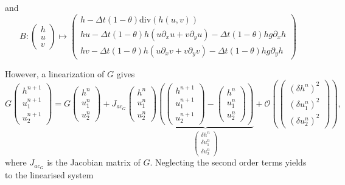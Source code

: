 \documentclass[a4paper, 11pt]{article}
\begin{document}
and
\begin{equation*}
B:
\begin{pmatrix}
h\\u\\v
\end{pmatrix}\mapsto\begin{pmatrix}h-\Delta t(1-\theta)\text{div}(h(u,v))\\
hu-\Delta t(1-\theta)h\left(u\partial_xu+v\partial_yu\right)-\Delta t(1-\theta)hg\partial_x h\\
hv-\Delta t(1-\theta)h\left(u\partial_xv+v\partial_yv\right)-\Delta t(1-\theta)hg\partial_y h
\end{pmatrix}
\end{equation*}


However, 
a linearization of $G$ gives
\begin{equation*}
G\begin{pmatrix}h^{n+1}\\u_1^{n+1}\\u_2^{n+1}\end{pmatrix}=G\begin{pmatrix}h^{n}\\u_1^{n}\\u_2^{n}\end{pmatrix}+J_{ac_G}\begin{pmatrix}h^n\\u_1^n\\u_2^n\end{pmatrix}\underbrace{\left(\begin{pmatrix}h^{n+1}\\u_1^{n+1}\\u_2^{n+1}\end{pmatrix}-\begin{pmatrix}h^n\\u_1^n\\u_2^n\end{pmatrix}\right)}_{\begin{pmatrix}\delta h^n\\\delta u_1^n\\\delta u_2^n\end{pmatrix}}+\mathcal{O}\left(\begin{pmatrix}(\delta h^n)^2\\(\delta u_1^n)^2\\(\delta u_2^n)^2\end{pmatrix}\right),
\end{equation*}
where $J_{ac_G}$ is the Jacobian matrix of $G$.
Neglecting the second order terms yields to the linearised system
\end{document}
